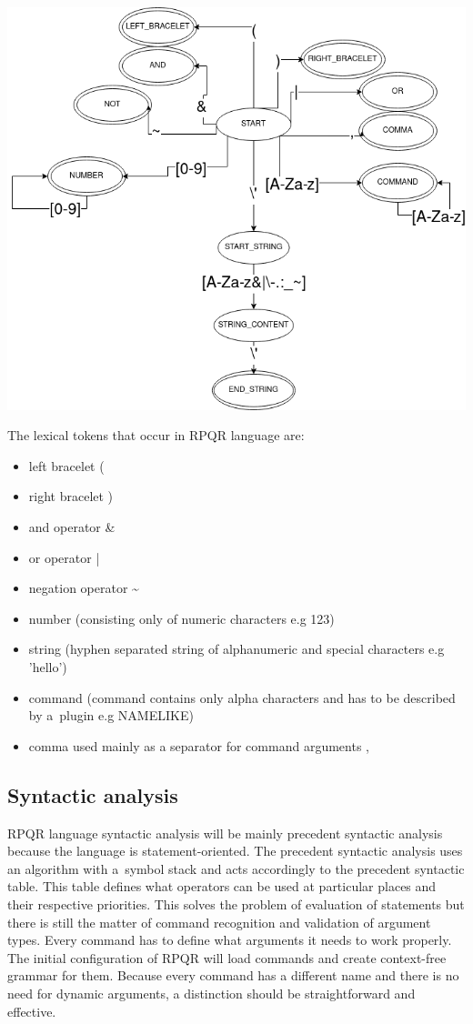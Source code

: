 \includegraphics[scale=0.5]{obrazky-figures/RPQR_FSM.png}

\newpage

The lexical tokens that occur in RPQR language are:
\begin{itemize}
  \item left bracelet (
  \item right bracelet )
  \item and operator \&
  \item or operator |
  \item negation operator \textasciitilde
  \item number (consisting only of numeric characters e.g 123)
  \item string (hyphen separated string of alphanumeric and special characters e.g 'hello')
  \item command (command contains only alpha characters and has to be described by a~plugin e.g NAMELIKE)
  \item comma used mainly as a separator for command arguments ,
\end{itemize}

\subsection*{Syntactic analysis}
RPQR language syntactic analysis will be mainly precedent syntactic analysis because the language is statement-oriented. The precedent syntactic analysis uses an algorithm with a~symbol stack and acts accordingly to the precedent
syntactic table. This table defines what operators can be used at particular places and their respective
priorities. This solves the problem of evaluation of statements but there is still the matter of command
recognition and validation of argument types. Every command has to define what arguments it needs to work
properly. The initial configuration of RPQR will load commands and create context-free grammar for them.
Because every command has a different name and there is no need for dynamic arguments, a distinction should
be straightforward and effective.

